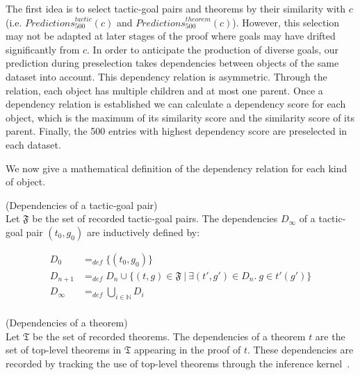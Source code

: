 \documentclass[runningheads,a4paper,draft]{svjour3}
\begin{document}

The first idea is to select tactic-goal pairs and theorems by their similarity
with $c$ (i.e. $\mathit{Predictions}^{\mathit{tactic}}_{500} (c)$ and
$\mathit{Predictions}^{\mathit{theorem}}_{500} (c)$).
However, this selection may not be adapted at later stages of
the proof where goals may have drifted significantly from $c$. In order to
anticipate the production of diverse goals, our prediction during preselection
takes dependencies between objects of the same dataset into account.
This dependency relation is asymmetric. Through the relation, each object has
multiple children and at most one parent.
Once a dependency relation is established we can calculate a dependency score
for each object, which is the maximum of its similarity score
and the similarity score of its parent. Finally, the 500 entries with
highest dependency score are preselected in each dataset.

We now give a mathematical definition of the dependency relation for each kind
of object.

\begin{definition}(Dependencies of a tactic-goal pair)\\
Let $\mathfrak{F}$ be the set of recorded tactic-goal pairs.
The dependencies $D_\infty$ of a tactic-goal pair $(t_0,g_0)$ are
inductively defined by:

\begin{align*}
D_0 &=_{def} \lbrace (t_0,g_0) \rbrace \\
D_{n+1} &=_{def} D_n \cup \lbrace (t,g)\in \mathfrak{F}\  |\ \exists
(t',g') \in D_n.\ g \in t'(g') \rbrace  \\
D_\infty &=_{def} \bigcup_{i \in \mathbb{N}} D_i\\
\end{align*}
\end{definition}


\begin{definition}(Dependencies of a theorem)\\
Let $\mathfrak{T}$ be the set of recorded theorems.
The dependencies of a theorem $t$ are the set of top-level theorems in
$\mathfrak{T}$ appearing in the proof of $t$. These dependencies are
recorded by tracking the use of top-level theorems through the inference
kernel~\cite{tgck-cpp15}.
\end{definition}
\end{document}

